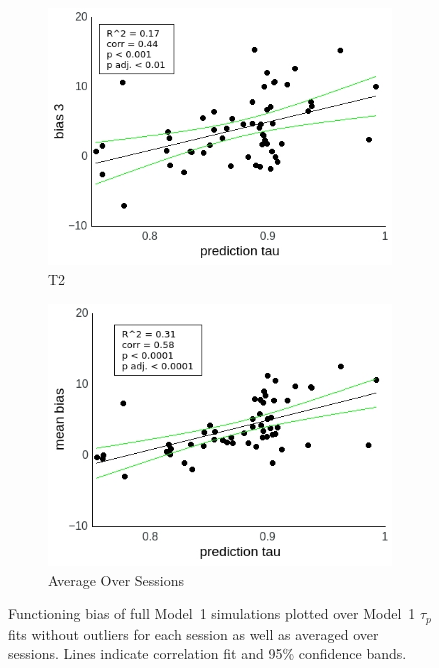 \documentclass[a4paper]{scrreprt}
\begin{document}
\begin{figure}
\begin{subfigure}[b]{0.49\textwidth}
        \includegraphics[width=\textwidth]{figs/sec3/pred/predno_diff_3_mod1mod1.jpeg}
        \caption{T2}
    \end{subfigure}
    \begin{subfigure}[b]{0.49\textwidth}
        \includegraphics[width=\textwidth]{figs/sec3/pred/predno_diff_mean_mod1mod1.jpeg}
        \caption{Average Over Sessions}
    \end{subfigure}
\caption{Functioning bias of full Model~1 simulations plotted over Model~1 $\tau_p$ fits without outliers for each session as well as averaged over sessions. Lines indicate correlation fit and 95\% confidence bands.}
\label{fig:predno_diff_mod1mod1}
\end{figure}
\end{document}
